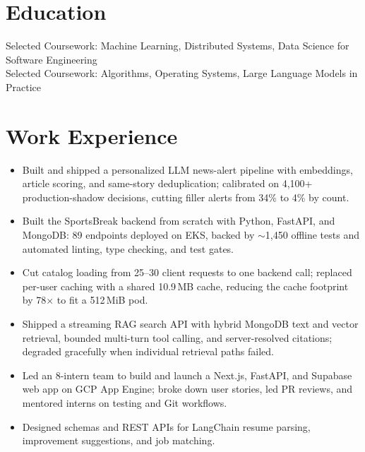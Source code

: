 \documentclass[11pt, letterpaper]{article}
\begin{document}

\section{Education}
Selected Coursework: Machine Learning, Distributed Systems, Data Science for Software Engineering\\[1pt]
Selected Coursework: Algorithms, Operating Systems, Large Language Models in Practice

\section{Work Experience}
\begin{itemize}
  \item Built and shipped a personalized LLM news-alert pipeline with embeddings, article scoring, and same-story deduplication; calibrated on 4{,}100+ production-shadow decisions, cutting filler alerts from 34\% to 4\% by count.
  \item Built the SportsBreak backend from scratch with Python, FastAPI, and MongoDB: 89 endpoints deployed on EKS, backed by $\sim$1{,}450 offline tests and automated linting, type checking, and test gates.
  \item Cut catalog loading from 25--30 client requests to one backend call; replaced per-user caching with a shared 10.9\,MB cache, reducing the cache footprint by 78$\times$ to fit a 512\,MiB pod.
  \item Shipped a streaming RAG search API with hybrid MongoDB text and vector retrieval, bounded multi-turn tool calling, and server-resolved citations; degraded gracefully when individual retrieval paths failed.
\end{itemize}

\vspace{1pt}
\begin{itemize}
  \item Led an 8-intern team to build and launch a Next.js, FastAPI, and Supabase web app on GCP App Engine; broke down user stories, led PR reviews, and mentored interns on testing and Git workflows.
  \item Designed schemas and REST APIs for LangChain resume parsing, improvement suggestions, and job matching.
\end{itemize}
\end{document}

